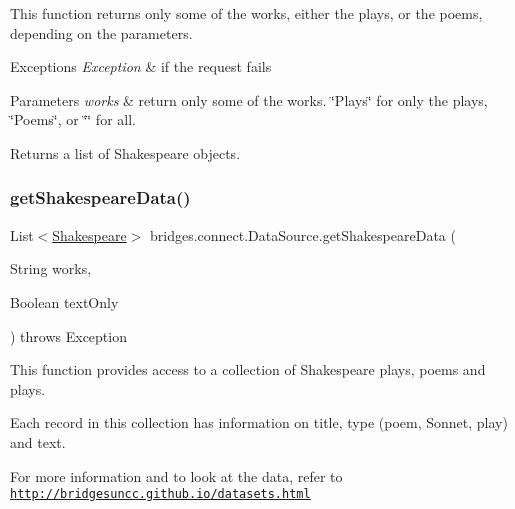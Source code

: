 This function returns only some of the works, either the plays, or the poems, depending on the parameters.


\begin{DoxyExceptions}{Exceptions}
{\em Exception} & if the request fails\\
\hline
\end{DoxyExceptions}

\begin{DoxyParams}{Parameters}
{\em works} & return only some of the works. \char`\"{}\+Plays\char`\"{} for only the plays, \char`\"{}\+Poems\char`\"{}, or \char`\"{}\char`\"{} for all.\\
\hline
\end{DoxyParams}
\begin{DoxyReturn}{Returns}
a list of Shakespeare objects. 
\end{DoxyReturn}
\mbox{\label{classbridges_1_1connect_1_1_data_source_abf8e8f8ff3eb14fa6c6b5ce6b48dbadb}} 
\subsubsection{\texorpdfstring{get\+Shakespeare\+Data()}{getShakespeareData()}\hspace{0.1cm}{\footnotesize\ttfamily [3/3]}}
{\footnotesize\ttfamily List$<$\hyperlink{classbridges_1_1data__src__dependent_1_1_shakespeare}{Shakespeare}$>$ bridges.\+connect.\+Data\+Source.\+get\+Shakespeare\+Data (\begin{DoxyParamCaption}\item[{String}]{works,  }\item[{Boolean}]{text\+Only }\end{DoxyParamCaption}) throws Exception}



This function provides access to a collection of Shakespeare plays, poems and plays. 

Each record in this collection has information on title, type (poem, Sonnet, play) and text.

For more information and to look at the data, refer to \href{http://bridgesuncc.github.io/datasets.html}{\tt http\+://bridgesuncc.\+github.\+io/datasets.\+html}


